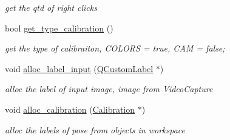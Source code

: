 \begin{DoxyCompactItemize}
\begin{DoxyCompactList}\small\item\em get the qtd of right clicks \end{DoxyCompactList}\item 
bool \hyperlink{classcalibration_ad22a724d4112abcb09ad8624e8b7d884}{get\+\_\+type\+\_\+calibration} ()\hypertarget{classcalibration_ad22a724d4112abcb09ad8624e8b7d884}{}\label{classcalibration_ad22a724d4112abcb09ad8624e8b7d884}

\begin{DoxyCompactList}\small\item\em get the type of calibraiton, C\+O\+L\+O\+RS = true, C\+AM = false; \end{DoxyCompactList}\item 
void \hyperlink{classcalibration_ab0b5f5514c665852aa63830121622518}{alloc\+\_\+label\+\_\+input} (\hyperlink{classQCustomLabel}{Q\+Custom\+Label} $\ast$)
\begin{DoxyCompactList}\small\item\em alloc the label of input image, image from Video\+Capture \end{DoxyCompactList}\item 
void \hyperlink{classcalibration_ac5e4cd1cead7176b0f34586112aaa918}{alloc\+\_\+calibration} (\hyperlink{structcommon_1_1Calibration}{Calibration} $\ast$)
\begin{DoxyCompactList}\small\item\em alloc the labels of pose from objects in workspace \end{DoxyCompactList}\end{DoxyCompactItemize}
